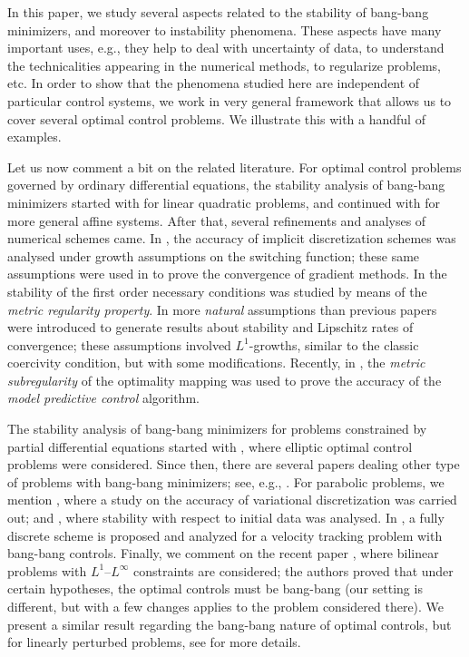 \documentclass[hidelinks,onefignum,onetabnum]{siamart220329}
\begin{document}
In this paper, we study several aspects related to the stability of bang-bang minimizers, and moreover to instability phenomena. These aspects  have many important uses, e.g., they help to deal with  uncertainty of data, to understand the technicalities appearing in the numerical methods, to regularize problems, etc.  In order to show that the phenomena studied here are independent  of  particular control systems, we work in very general framework that allows us to cover several optimal control problems. We illustrate this with a handful of examples.


Let us now comment a bit on the related literature.  For optimal control problems governed by ordinary differential equations, the stability analysis of bang-bang minimizers started with \cite{Ursulabb} for linear quadratic problems, and continued with \cite{Ursulabb2} for more general affine systems. After that, several refinements and analyses of numerical schemes came. In \cite{Seyd1, BjsCH}, the accuracy of implicit discretization schemes was analysed under growth assumptions on the switching function; these same assumptions  were used  in \cite{Khelifa,Prei} to prove the convergence of gradient methods. In  \cite{CQS,VQreg} the stability of the first order necessary conditions was studied by means of the\textit{ metric regularity property}. In \cite{Bimetric,Osmo} more \textit{natural} assumptions than previous papers were introduced to generate results about stability and Lipschitz rates of convergence; these assumptions involved $L^1$-growths, similar to the classic coercivity condition, but with some modifications. Recently, in \cite{Mpc,Sozopol}, the \textit{metric subregularity} of the optimality mapping was used to prove the accuracy of the \textit{model predictive control} algorithm.


The stability analysis of bang-bang minimizers for problems constrained by partial differential equations started with \cite{Soac,Hinzebb}, where elliptic optimal control problems were considered. Since then, there are several papers dealing other type of problems with bang-bang minimizers; see, e.g., \cite{CCJ,Elliptic,NiFE,DWQN}. For  parabolic problems, we mention  \cite{Par}, where a study on the accuracy of variational discretization  was carried out;  and  \cite{ParCasas}, where stability with respect to initial data was analysed. In \cite{Casasfluids},  a fully discrete scheme is proposed and analyzed for a velocity tracking problem with bang-bang controls. Finally, we comment on the recent paper \cite{Idriss}, where bilinear problems with  $L^1$--$L^\infty$ constraints are considered; the authors proved that under certain hypotheses, the optimal controls must be bang-bang (our setting is different, but with a few changes applies to the problem considered there). We present a similar result regarding the bang-bang nature of optimal controls, but for linearly perturbed problems, see  for more details.
\end{document}
